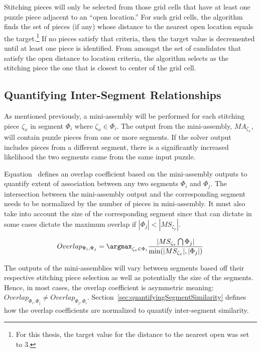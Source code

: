 Stitching pieces will only be selected from those grid cells that have at least one puzzle piece adjacent to an ``open location.'' For such grid cells, the algorithm finds the set of pieces (if any) whose distance to the nearest open location equals the target.\footnote{For this thesis, the target value for the distance to the nearest open was set to 3.}  If no pieces satisfy that criteria, then the target value is decremented until at least one piece is identified. From amongst the set of candidates that satisfy the open distance to location criteria, the algorithm selects as the stitching piece the one that is closest to center of the grid cell.  

\subsection{Quantifying Inter-Segment Relationships}

As mentioned previously, a mini-assembly will be performed for each stitching piece $\zeta_x$ in segment $\Phi_i$ where $\zeta_x \in \Phi_i$.  The output from the mini-assembly, $MA_{\zeta_x}$, will contain puzzle pieces from one or more segments.  If the solver output includes pieces from a different segment, there is a significantly increased likelihood the two segments came from the same input puzzle. 

Equation~ defines an overlap coefficient based on the mini-assembly outputs to quantify extent of association between any two segments $\Phi_i$ and $\Phi_j$. The intersection between the mini-assembly output and the corresponding segment needs to be normalized by the number of pieces in mini-assembly.  It must also take into account the size of the corresponding segment since that can dictate in some cases dictate the maximum overlap if $|\Phi_j| < |MS_{\zeta_x}|$.

\begin{equation} \label{eq:segmentOverlap}
Overlap_{\Phi_i,\Phi_j} = \argmax_{\zeta_x \in \Phi_i} {\frac{|MS_{\zeta_x} \bigcap \Phi_j|}{\text{min}(|MS_{\zeta_x}|, |\Phi_j|)}}
\end{equation}

The outputs of the mini-assemblies will vary between segments based off their respective stitching piece selection as well as potentially the size of the segments.  Hence, in most cases, the overlap coefficient is asymmetric meaning: $Overlap_{\Phi_i,\Phi_j} \neq Overlap_{\Phi_j,\Phi_i}$.  Section~\ref{sec:quantifyingSegmentSimilarity} defines how the overlap coefficients are normalized to quantify inter-segment similarity.

